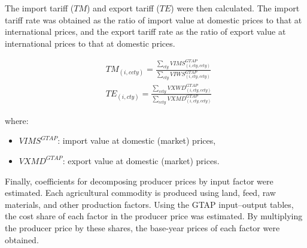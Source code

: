 \bigskip

The import tariff (\( TM \)) and export tariff (\( TE \)) were then calculated.  
The import tariff rate was obtained as the ratio of import value at domestic prices 
to that at international prices, 
and the export tariff rate as the ratio of export value at international prices 
to that at domestic prices.

\begin{align}
&TM_{(i,ccty)} = 
\frac{\sum_{cty} VIMS^{GTAP}_{(i,cty,ccty)}}{\sum_{cty} VIWS^{GTAP}_{(i,cty,ccty)}} \\
&TE_{(i,cty)} = 
\frac{\sum_{ccty} VXWD^{GTAP}_{(i,cty,ccty)}}{\sum_{ccty} VXMD^{GTAP}_{(i,cty,ccty)}}
\end{align}

where:
\begin{itemize}
\item \( VIMS^{GTAP} \): import value at domestic (market) prices,  
\item \( VXMD^{GTAP} \): export value at domestic (market) prices.
\end{itemize}

\bigskip

Finally, coefficients for decomposing producer prices by input factor 
were estimated.  
Each agricultural commodity is produced using land, feed, raw materials, 
and other production factors.  
Using the GTAP input–output tables, the cost share of each factor 
in the producer price was estimated.  
By multiplying the producer price by these shares, 
the base-year prices of each factor were obtained.

